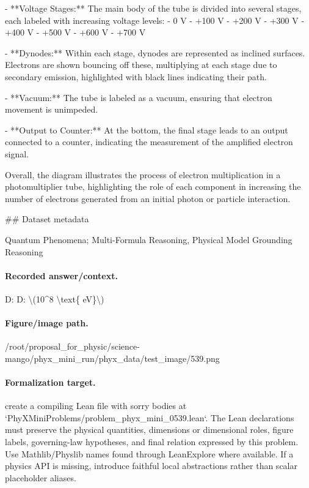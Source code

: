 - **Voltage Stages:** The main body of the tube is divided into several stages, each labeled with increasing voltage levels:
  - 0 V
  - +100 V
  - +200 V
  - +300 V
  - +400 V
  - +500 V
  - +600 V
  - +700 V

- **Dynodes:** Within each stage, dynodes are represented as inclined surfaces. Electrons are shown bouncing off these, multiplying at each stage due to secondary emission, highlighted with black lines indicating their path.

- **Vacuum:** The tube is labeled as a vacuum, ensuring that electron movement is unimpeded.

- **Output to Counter:** At the bottom, the final stage leads to an output connected to a counter, indicating the measurement of the amplified electron signal.

Overall, the diagram illustrates the process of electron multiplication in a photomultiplier tube, highlighting the role of each component in increasing the number of electrons generated from an initial photon or particle interaction.

\#\# Dataset metadata

Quantum Phenomena; Multi-Formula Reasoning, Physical Model Grounding Reasoning

\paragraph{Recorded answer/context.}
D: D: \textbackslash{}(10\textasciicircum{}8 \textbackslash{}text\{ eV\}\textbackslash{})

\paragraph{Figure/image path.}
/root/proposal\_for\_physic/science-mango/phyx\_mini\_run/phyx\_data/test\_image/539.png

\paragraph{Formalization target.}
create a compiling Lean file with sorry bodies at `PhyXMiniProblems/problem\_phyx\_mini\_0539.lean`. The Lean declarations must preserve the physical quantities, dimensions or dimensional roles, figure labels, governing-law hypotheses, and final relation expressed by this problem.
Use Mathlib/Physlib names found through LeanExplore where available. If a physics API is missing, introduce faithful local abstractions rather than scalar placeholder aliases.

